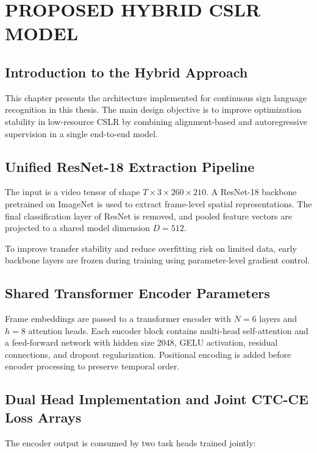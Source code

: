 \chapter{PROPOSED HYBRID CSLR MODEL}

\section{Introduction to the Hybrid Approach}

This chapter presents the architecture implemented for continuous sign language recognition in this thesis. The main design objective is to improve optimization stability in low-resource CSLR by combining alignment-based and autoregressive supervision in a single end-to-end model.

\section{Unified ResNet-18 Extraction Pipeline}

The input is a video tensor of shape $T \times 3 \times 260 \times 210$. A ResNet-18 backbone pretrained on ImageNet is used to extract frame-level spatial representations. The final classification layer of ResNet is removed, and pooled feature vectors are projected to a shared model dimension $D=512$.

To improve transfer stability and reduce overfitting risk on limited data, early backbone layers are frozen during training using parameter-level gradient control.

\section{Shared Transformer Encoder Parameters}

Frame embeddings are passed to a transformer encoder with $N=6$ layers and $h=8$ attention heads. Each encoder block contains multi-head self-attention and a feed-forward network with hidden size 2048, GELU activation, residual connections, and dropout regularization. Positional encoding is added before encoder processing to preserve temporal order.

\section{Dual Head Implementation and Joint CTC-CE Loss Arrays}

The encoder output is consumed by two task heads trained jointly:

